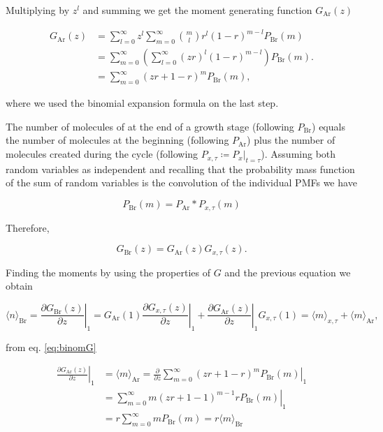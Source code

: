 Multiplying by $z^l$ and summing we get the moment generating function $G_\text{Ar}(z)$

\begin{equation}
  \label{eq:binomG}
  \begin{split}
    G_\text{Ar}(z) &= \sum_{l=0}^\infty z^l\sum_{m=0}^\infty {m\choose l}r^l(1-r)^{m-l}P_\text{Br}(m)\\
    &= \sum_{m=0}^\infty\left(\sum_{l=0}^\infty (zr)^l(1-r)^{m-l}\right)P_\text{Br}(m).\\
    &= \sum_{m=0}^\infty(zr+1-r)^{m}P_\text{Br}(m),
  \end{split}
\end{equation}

where we used the binomial expansion formula on the last step.

The number of molecules of at the end of a growth stage (following $P_\text{Br}$) equals the number of molecules at the beginning (following $P_\text{Ar}$) plus the number of molecules created during the cycle (following $P_{x,\tau} \coloneqq P_x|_{t=\tau}$). Assuming both random variables as independent and recalling that the probability mass function of the sum of random variables is the convolution of the individual PMFs we have


\begin{equation*}
  P_\text{Br}(m) = P_\text{Ar}\ast P_{x,\tau}(m)
\end{equation*}

Therefore,

\begin{equation}
  G_\text{Br}(z) = G_\text{Ar}(z)G_{x,\tau}(z).
\end{equation}

Finding the moments by using the properties of $G$ and the previous equation we obtain

\begin{equation*}
  \langle n\rangle_\text{Br} = \left.\frac{\partial G_\text{Br}(z)}{\partial z}\right|_1 = G_\text{Ar}(1)\left.\frac{\partial G_{x,\tau}(z)}{\partial z}\right|_1 + \left.\frac{\partial G_\text{Ar}(z)}{\partial z}\right|_1G_{x,\tau}(1) = \langle m\rangle_{x,\tau} + \langle m\rangle_\text{Ar},
\end{equation*}

from eq. \ref{eq:binomG} 

\begin{equation*}
  \begin{split}
  \left.\frac{\partial G_\text{Ar}(z)}{\partial z}\right|_1 &= \langle m\rangle_\text{Ar} = \left.\frac{\partial}{\partial z} \sum_{m=0}^\infty(zr+1-r)^mP_\text{Br}(m)\right|_1\\
&= \left.\sum_{m=0}^\infty m(zr+1-1)^{m-1}rP_\text{Br}(m)\right|_1\\
&= r\sum_{m=0}^\infty mP_\text{Br}(m) = r\langle m\rangle_\text{Br}
  \end{split}
\end{equation*}
  
